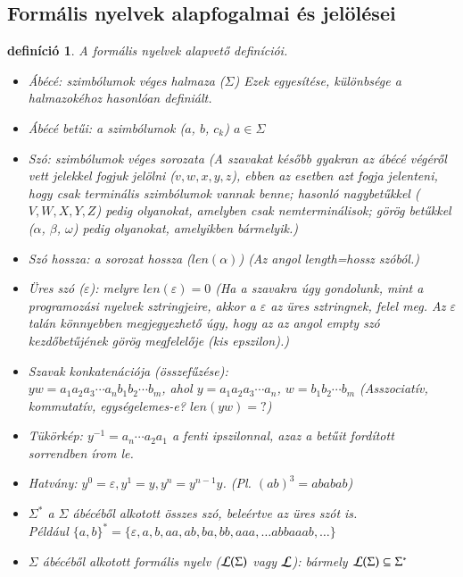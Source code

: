 \documentclass[a4paper]{article}
\newtheorem{definicio}{definíció}[section]
\begin{document}
\subsection*{Formális nyelvek alapfogalmai és jelölései}
\begin{definicio} A formális nyelvek alapvető definíciói.
\par
\begin{itemize}
\item Ábécé: szimbólumok véges halmaza ($\Sigma$) Ezek egyesítése,
különbsége a halmazokéhoz hasonlóan definiált.
\item Ábécé betűi: a szimbólumok ($a$, $b$, $c_k$)\: $a\in \Sigma$
\item Szó: szimbólumok véges sorozata
(A szavakat később gyakran az ábécé végéről vett jelekkel fogjuk
jelölni ($v, w, x, y, z$), ebben az esetben azt fogja jelenteni, hogy csak terminális
szimbólumok vannak benne; hasonló nagybetűkkel ($V, W, X, Y, Z$) pedig
olyanokat, amelyben csak nemterminálisok; görög betűkkel  ($\alpha$,
$\beta$, $\omega$) pedig olyanokat, amelyikben bármelyik.)
\item Szó hossza: a sorozat hossza ($len(\alpha)$) (Az angol
length=hossz szóból.)
\item Üres szó ($\varepsilon$): melyre $len(\varepsilon) = 0$ (Ha a
szavakra úgy gondolunk, mint a programozási nyelvek sztringjeire, akkor
a $\varepsilon$ az üres sztringnek, felel meg. Az $\varepsilon$ talán
könnyebben megjegyezhető úgy, hogy az az angol empty szó kezdőbetűjének
görög megfelelője (kis epszilon).)
\item Szavak konkatenációja (összefűzése):\\ $y w = a_1 a_2 a_3 \cdots a_n
	b_1 b_2 \cdots b_m$,
	ahol  $y =a_1 a_2 a_3 \cdots a_n$, $w = b_1 b_2 \cdots b_m$
	(Asszociatív, kommutatív, egységelemes-e? $len(y w)=?$)
\item Tükörkép: $y^{-1}=a_n \cdots a_2 a_1$ a fenti ipszilonnal, azaz a
betűit fordított sorrendben írom le.
\item Hatvány: $y^0=\varepsilon, y^1=y,
	y^n=y^{n-1}y$. (Pl. $(ab)^3=ababab$)
\item $\Sigma^*$ a $\Sigma$ ábécéből alkotott összes szó, beleértve az
    üres szót is.\\
    Például $\{a,b\}^*=\{\varepsilon, a, b, aa, ab, ba, bb, aaa, \ldots
    abbaaab, \ldots\}$
\item $\Sigma$ ábécéből alkotott formális nyelv (${\cal L}(\Sigma)$ vagy ${\cal L}$):
	bármely ${\cal L}(\Sigma) \subseteq \Sigma^*$
\end{itemize}
\end{definicio}
\end{document}

